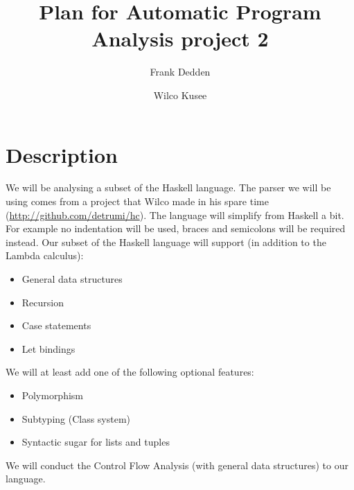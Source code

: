 \documentclass[10pt]{article}
\title{Plan for Automatic Program Analysis project 2}
\author{Frank Dedden \and Wilco Kusee}
\begin{document}
\maketitle

\section*{Description}
We will be analysing a subset of the Haskell language. The parser we will be using comes from a project that Wilco made in his spare time (\url{http://github.com/detrumi/hc}). The language will simplify from Haskell a bit. For example no indentation will be used, braces and semicolons will be required instead.
Our subset of the Haskell language will support (in addition to the Lambda calculus):
\begin{itemize}
    \item General data structures
    \item Recursion
    \item Case statements
    \item Let bindings
\end{itemize}
We will at least add one of the following optional features:
\begin{itemize}
    \item Polymorphism
    \item Subtyping (Class system)
    \item Syntactic sugar for lists and tuples
\end{itemize}
We will conduct the Control Flow Analysis (with general data structures) to our language.
\end{document}
